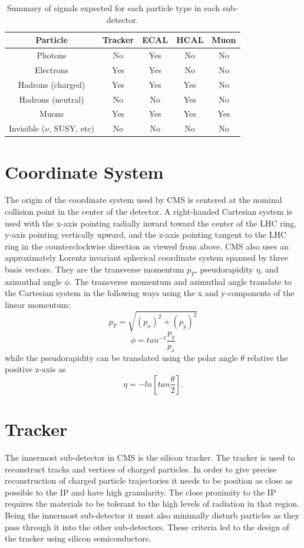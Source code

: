 \begin{table}[h]
	\centering
\begin{tabular}{|c|c|c|c|c|}
	\hline 
	Particle & Tracker & ECAL & HCAL & Muon \\ 
	\hline 
	Photons & No & Yes & No & No \\ 
	\hline 
	Electrons & Yes & Yes & No & No \\ 
	\hline 
	Hadrons (charged) & Yes & Yes & Yes & No \\ 
	\hline 
	Hadrons (neutral) & No & No & Yes & No \\ 
	\hline 
	Muons & Yes & Yes & Yes & Yes \\ 
	\hline 
	Invisible ($\nu$, SUSY, etc) & No & No & No & No \\ 
	\hline 
\end{tabular} 
\caption{Summary of signals expected for each particle type in each sub-detector.}
\label{table:subdetsignals}
\end{table}


\section{Coordinate System}
The origin of the coordinate system used by CMS is centered at the nominal collision point in the center of the detector.  A right-handed Cartesian system is used with the x-axis pointing radially inward toward the center of the LHC ring, y-axis pointing vertically upward, and the z-axis pointing tangent to the LHC ring in the counterclockwise direction as viewed from above.  CMS also uses an approximately Lorentz invariant spherical coordinate system spanned by three basis vectors.  They are the transverse momentum $p_{T}$, pseudorapidity $\eta$, and azimuthal angle $\phi$.  The transverse momentum and azimuthal angle translate to the Cartesian system in the following ways using the x and y-components of the linear momentum:
\begin{equation}
p_{T} = \sqrt{(p_{x})^{2} + (p_{y})^{2}}
\end{equation}
\begin{equation}
\phi = tan^{-1}\frac{p_{y}}{p_{x}}
\end{equation}
while the pseudorapidity can be translated using the polar angle $\theta$ relative the positive z-axis as
\begin{equation}
\eta = -ln[tan\frac{\theta}{2}].
\end{equation}


\section{Tracker}
The innermost sub-detector in CMS is the silicon tracker.  The tracker is used to reconstruct tracks and vertices of charged particles.  In order to give precise reconstruction of charged particle trajectories it needs to be position as close as possible to the IP and have high granularity.  The close proximity to the IP requires the materials to be tolerant to the high levels of radiation in that region.  Being the innermost sub-detector it must also minimally disturb particles as they pass through it into the other sub-detectors.  These criteria led to the design of the tracker using silicon semiconductors.

